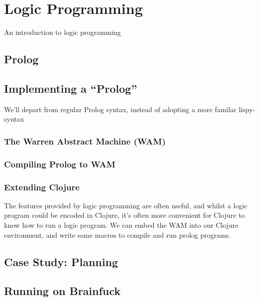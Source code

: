 \chapter{Logic Programming}

An introduction to logic programming

\section{Prolog}

\section{Implementing a ``Prolog''}

We'll depart from regular Prolog syntax, instead of adopting a more
familar lispy-syntax

\subsection{The Warren Abstract Machine (WAM)}

\subsection{Compiling Prolog to WAM}

\subsection{Extending Clojure}

The features provided by logic programming are often useful, and
whilst a logic program could be encoded in Clojure, it's often more
convenient for Clojure to know how to run a logic program. We can
embed the WAM into our Clojure environment, and write some macros to
compile and run prolog programs.

\section{Case Study: Planning}

\section{Running on Brainfuck}


